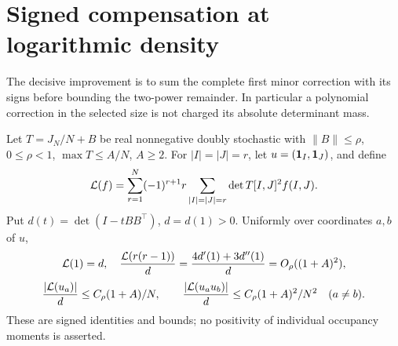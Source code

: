 \section{Signed compensation at logarithmic density}
\label{sec:signedjetcomparison}
The decisive improvement is to sum the complete first minor
correction with its signs before bounding the two-power
remainder. In particular a polynomial correction in the
selected size is not charged its absolute determinant mass.

\begin{lemma}
\label{lem:signedoccupancy}
Let \(T=J_N/N+B\) be real nonnegative doubly stochastic with
\(\|B\|\leq\rho\), \(0\leq\rho<1\), \(\max T\leq A/N\), \(A\geq2\).
For \(|I|=|J|=r\), let \(u=(\mathbf1_I,\mathbf1_J)\), and define
\[
 {\cal L}(f)=\sum_{r=1}^N(-1)^{r+1}r
       \sum_{|I|=|J|=r}\det T[I,J]^2 f(I,J).
\]
Put \(d(t)=\det(I-tBB^\top)\), \(d=d(1)>0\).
Uniformly over coordinates \(a,b\) of \(u\),
\[
 {\cal L}(1)=d,\quad
 \frac{{\cal L}(r(r-1))}{d}
                =\frac{4d'(1)+3d''(1)}d=O_\rho((1+A)^2),
\]
\[
 \frac{|{\cal L}(u_a)|}{d}\leq C_\rho(1+A)/N,\qquad
 \frac{|{\cal L}(u_a u_b)|}{d}
          \leq C_\rho(1+A)^2/N^2\quad(a\ne b).
\]
These are signed identities and bounds; no positivity of
individual occupancy moments is asserted.
\end{lemma}
